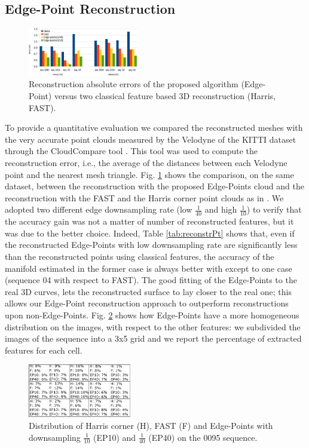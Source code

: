 \subsection{Edge-Point Reconstruction}
\label{sec:experimental-results}
\begin{figure}[t]
  \centering
  \includegraphics[width=0.43\textwidth]{././img//risultati.pdf}
  \caption{Reconstruction absolute errors of the proposed algorithm (Edge-Point) versus two classical feature based 3D reconstruction (Harris, FAST).}
   \label{tab:comp}
\end{figure}

To provide a quantitative evaluation we compared the reconstructed meshes with the very accurate point clouds measured by the Velodyne of the KITTI dataset through the CloudCompare tool \cite{CloudCompare}.
This tool was used to compute the reconstruction error, i.e., the average of the distances between each Velodyne point and the nearest mesh triangle.
Fig. \ref{tab:comp} shows the comparison, on the same dataset, between the reconstruction with the proposed Edge-Points cloud and the reconstruction with the FAST and the Harris corner point clouds as in \cite{litvinov_Lhiuller14}.  
We adopted two different edge downsampling rate (low $\frac{1}{40}$ and high $\frac{1}{10}$) to verify that the accuracy gain was not a matter of number of reconstructed features, but it was due to the better choice. 
Indeed, Table \ref{tab:reconstrPt} shows that, even if the reconstructed Edge-Points with low downsampling rate are significantly less than the reconstructed points using classical features, the accuracy of the manifold estimated in the former case is always better with except to one case (sequence 04 with respect to FAST).  
The good fitting of the Edge-Points to the real 3D curves, lets the reconstructed surface to lay closer to the real one; this allows our Edge-Point reconstruction approach to outperform reconstructions upon non-Edge-Points.
Fig. \ref{fig:distr} shows how Edge-Points have a more homogeneous distribution on the images, with respect to the other features: we subdivided the images of the sequence into a 3x5 grid and we report the percentage of extracted features for each cell.


\begin{figure}[t]
  \centering
  \includegraphics[width=0.4\textwidth,height=0.18\textwidth]{././img//distribution}
  \caption{Distribution of Harris corner (H), FAST (F) and Edge-Points with downsampling $\frac{1}{10}$ (EP10) and $\frac{1}{40}$ (EP40) on the 0095 sequence.}
   \label{fig:distr}
\end{figure}


